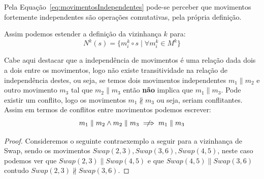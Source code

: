 
Pela Equação~\ref{eq:movimentosIndependentes} pode-se perceber que movimentos fortemente independentes são operações comutativas, pela própria definição.

Assim podemos estender a definição da vizinhança $k$ para:
\begin{equation}  \label{eq:vizinhanca}
N^k(s) = \{ m^k_i \circ s \mid \forall m^k_i \in M^k \}
\end{equation}

Cabe aqui destacar que a independência de movimentos é uma relação dada dois a dois entre os movimentos, logo não existe transitividade na relação de independência destes, ou seja, se temos dois movimentos independentes $m_1 \parallel m_2$ e outro movimento $m_3$ tal que $m_2 \parallel m_3$ então \textbf{não} implica que $m_1 \parallel m_3$.
Pode existir um conflito, logo os movimentos $m_1 \nparallel m_3$ ou seja, seriam conflitantes.
Assim em termos de conflitos entre movimentos podemos escrever:
\begin{equation}
m_1 \parallel m_2 \land m_2 \parallel m_3 \centernot\implies m_1 \parallel m_3
\end{equation}

\begin{proof}
Consideremos o seguinte contraexemplo a seguir para a vizinhança de Swap, sendo os movimentos $Swap(2,3), Swap(3,6), Swap(4,5)$, neste caso podemos ver que $Swap(2,3) \parallel Swap(4,5)$ e que $Swap(4,5) \parallel Swap(3,6)$ contudo $Swap(2,3) \nparallel Swap(3,6)$.
\end{proof}


